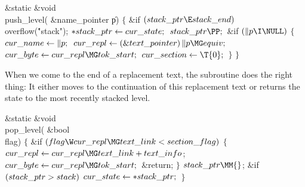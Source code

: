 \Y\B\1\1\&{static} \&{void} \\{push\_level}(\6
\&{name\_pointer} \|p)\2\2\6
${}\{{}$\1\6
\&{if} ${}(\\{stack\_ptr}\E\\{stack\_end}){}$\1\5
\\{overflow}(\.{"stack"});\2\6
${}{*}\\{stack\_ptr}\leftarrow\\{cur\_state};{}$\6
${}\\{stack\_ptr}\PP;{}$\6
\&{if} ${}(\|p\I\NULL){}$\5
${}\{{}$\1\6
${}\\{cur\_name}\leftarrow\|p;{}$\6
${}\\{cur\_repl}\K(\&{text\_pointer})\,\|p\MG\\{equiv};{}$\6
${}\\{cur\_byte}\K\\{cur\_repl}\MG\\{tok\_start};{}$\6
${}\\{cur\_section}\K\T{0};{}$\6
\4${}\}{}$\2\6
\4${}\}{}$\2\par
\fi

When we come to the end of a replacement text, the 
subroutine
does the right thing: It either moves to the continuation of this replacement
text or returns the state to the most recently stacked level.

\Y\B\1\1\&{static} \&{void} \\{pop\_level}(\6
\&{bool} \\{flag})\2\2\6
${}\{{}$\1\6
\&{if} ${}(\\{flag}\W\\{cur\_repl}\MG\\{text\_link}<\\{section\_flag}){}$\5
${}\{{}$\1\6
${}\\{cur\_repl}\K\\{cur\_repl}\MG\\{text\_link}+\\{text\_info}{}$;\6
${}\\{cur\_byte}\K\\{cur\_repl}\MG\\{tok\_start};{}$\6
\&{return};\6
\4${}\}{}$\2\6
${}\\{stack\_ptr}\MM{}$;\6
\&{if} ${}(\\{stack\_ptr}>\\{stack}){}$\1\5
${}\\{cur\_state}\leftarrow{*}\\{stack\_ptr};{}$\2\6
\4${}\}{}$\2\par
\fi

